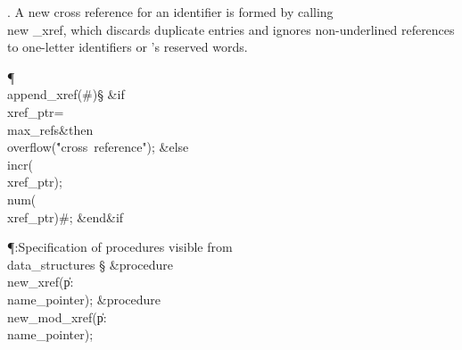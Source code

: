 . A new cross reference for an identifier is formed by calling \\{new%
\_xref},
which discards duplicate entries and ignores non-underlined references
to one-letter identifiers or \ADA's reserved words.

\Y\P\4\D\\{append\_xref}\?\1(\?\#\?\2)\S\?\6
\&{if}\1\1\8\\{xref\_ptr}\?=\?\\{max\_refs}\2\8\&{then}\6
\\{overflow}\?\1(\?\.{"cross\ reference"}\?\2)\?;\6
\4\&{else}\6
\\{incr}\?\1(\?\\{xref\_ptr}\?\2)\?;\5
\\{num}\?\1(\?\\{xref\_ptr}\?\2)\K\?\#;\2\6
\&{end}\8\2\&{if}\1\par
\Y\P\?\4:Specification of procedures visible from \\{data\_structures}\X%
\mathrel{+}\S\?\6
\&{procedure}\8\1\\{new\_xref}\?(\1\?\|p\?:\?\\{name\_pointer}\?\2)\?\2;\6
\&{procedure}\8\1\\{new\_mod\_xref}\?(\1\?\|p\?:\?\\{name\_pointer}\?\2)\?\2;%
\par
\fi

